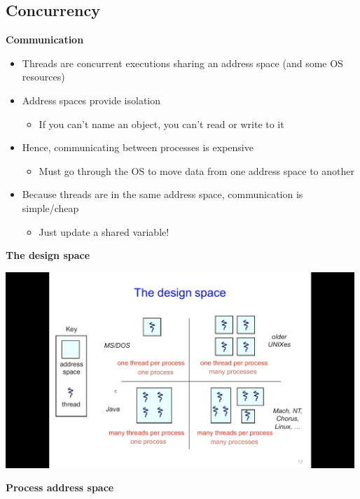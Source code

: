 \documentclass[11pt,a4paper]{article}
\begin{document}
\subsection{Concurrency}

\textbf{Communication}
\begin{itemize}
    \item Threads are concurrent executions sharing an address space (and some OS resources)
    \item Address spaces provide isolation
        \begin{itemize}
            \item If you can't name an object, you can't read or write to it
        \end{itemize}
    \item Hence, communicating between processes is expensive
        \begin{itemize}
            \item Must go through the OS to move data from one address space to another
        \end{itemize}
    \item Because threads are in the same address space, communication is simple/cheap
        \begin{itemize}
            \item Just update a shared variable!
        \end{itemize}
\end{itemize}

\textbf{The design space}

\includegraphics[height=280]{the-design-space.jpg}

\textbf{Process address space}
\end{document}
